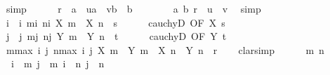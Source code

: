 \begin{isabellebody}
\ simp\isanewline
\ \ \ \ \isamarkupfalse%
\ {\isachardoublequoteopen}r\ {\isacharequal}{\kern0pt}\ a\ {\isacharasterisk}{\kern0pt}\ {\isacharparenleft}{\kern0pt}u{\isacharslash}{\kern0pt}a{\isacharparenright}{\kern0pt}\ {\isacharplus}{\kern0pt}\ {\isacharparenleft}{\kern0pt}v{\isacharslash}{\kern0pt}b{\isacharparenright}{\kern0pt}\ {\isacharasterisk}{\kern0pt}\ b{\isachardoublequoteclose}\isanewline
\ \ \ \ \ \ \isamarkupfalse%
\ a{\isacharparenleft}{\kern0pt}{}{\isacharparenright}{\kern0pt}\ b{\isacharparenleft}{\kern0pt}{}{\isacharparenright}{\kern0pt}\ {\isacartoucheopen}r\ {\isacharequal}{\kern0pt}\ u\ {\isacharplus}{\kern0pt}\ v{\isacartoucheclose}\ \isamarkupfalse%
\ simp\isanewline
\ \ \isamarkupfalse%
\isanewline
\ \ \isamarkupfalse%
\ i\ \ i{\isacharcolon}{\kern0pt}\ {\isachardoublequoteopen}{\isasymforall}m{\isasymge}i{\isachardot}{\kern0pt}\ {\isasymforall}n{\isasymge}i{\isachardot}{\kern0pt}\ {\isasymbar}X\ m\ {\isacharminus}{\kern0pt}\ X\ n{\isasymbar}\ {\isacharless}{\kern0pt}\ s{\isachardoublequoteclose}\isanewline
\ \ \ \ \isamarkupfalse%
\ cauchyD\ {\isacharbrackleft}{\kern0pt}OF\ X\ s{\isacharbrackright}{\kern0pt}\ \isacommand{{\isachardot}{\kern0pt}{\isachardot}{\kern0pt}}\isamarkupfalse%
\isanewline
\ \ \isamarkupfalse%
\ j\ \ j{\isacharcolon}{\kern0pt}\ {\isachardoublequoteopen}{\isasymforall}m{\isasymge}j{\isachardot}{\kern0pt}\ {\isasymforall}n{\isasymge}j{\isachardot}{\kern0pt}\ {\isasymbar}Y\ m\ {\isacharminus}{\kern0pt}\ Y\ n{\isasymbar}\ {\isacharless}{\kern0pt}\ t{\isachardoublequoteclose}\isanewline
\ \ \ \ \isamarkupfalse%
\ cauchyD\ {\isacharbrackleft}{\kern0pt}OF\ Y\ t{\isacharbrackright}{\kern0pt}\ \isacommand{{\isachardot}{\kern0pt}{\isachardot}{\kern0pt}}\isamarkupfalse%
\isanewline
\ \ \isamarkupfalse%
\ {\isachardoublequoteopen}{\isasymforall}m{\isasymge}max\ i\ j{\isachardot}{\kern0pt}\ {\isasymforall}n{\isasymge}max\ i\ j{\isachardot}{\kern0pt}\ {\isasymbar}X\ m\ {\isacharasterisk}{\kern0pt}\ Y\ m\ {\isacharminus}{\kern0pt}\ X\ n\ {\isacharasterisk}{\kern0pt}\ Y\ n{\isasymbar}\ {\isacharless}{\kern0pt}\ r{\isachardoublequoteclose}\isanewline
\ \ \isamarkupfalse%
\ clarsimp\isanewline
\ \ \ \ \isamarkupfalse%
\ m\ n\isanewline
\ \ \ \ \isamarkupfalse%
\ {\isacharasterisk}{\kern0pt}{\isacharcolon}{\kern0pt}\ {\isachardoublequoteopen}i\ {\isasymle}\ m{\isachardoublequoteclose}\ {\isachardoublequoteopen}j\ {\isasymle}\ m{\isachardoublequoteclose}\ {\isachardoublequoteopen}i\ {\isasymle}\ n{\isachardoublequoteclose}\ {\isachardoublequoteopen}j\ {\isasymle}\ n{\isachardoublequoteclose}\isanewline

\end{isabellebody}

